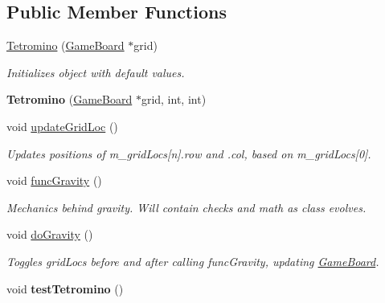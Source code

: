 \subsection*{Public Member Functions}
\begin{DoxyCompactItemize}
\item 
\hyperlink{class_tetromino_a1e693a4b99478302e7c7071667512e5f}{Tetromino} (\hyperlink{class_game_board}{Game\-Board} $\ast$grid)
\begin{DoxyCompactList}\small\item\em Initializes object with default values. \end{DoxyCompactList}\item 
\hypertarget{class_tetromino_a7be393128fb83186dbf63279f5200387}{{\bfseries Tetromino} (\hyperlink{class_game_board}{Game\-Board} $\ast$grid, int, int)}\label{class_tetromino_a7be393128fb83186dbf63279f5200387}

\item 
\hypertarget{class_tetromino_abe7074d0ac3811a17e567f1f810dcfef}{void \hyperlink{class_tetromino_abe7074d0ac3811a17e567f1f810dcfef}{update\-Grid\-Loc} ()}\label{class_tetromino_abe7074d0ac3811a17e567f1f810dcfef}

\begin{DoxyCompactList}\small\item\em Updates positions of m\-\_\-grid\-Locs\mbox{[}n\mbox{]}.row and .col, based on m\-\_\-grid\-Locs\mbox{[}0\mbox{]}. \end{DoxyCompactList}\item 
\hypertarget{class_tetromino_afca549c6385f4382e28597524672f30f}{void \hyperlink{class_tetromino_afca549c6385f4382e28597524672f30f}{func\-Gravity} ()}\label{class_tetromino_afca549c6385f4382e28597524672f30f}

\begin{DoxyCompactList}\small\item\em Mechanics behind gravity. Will contain checks and math as class evolves. \end{DoxyCompactList}\item 
\hypertarget{class_tetromino_a209a18d5248708f8504c2c19cd3b96d8}{void \hyperlink{class_tetromino_a209a18d5248708f8504c2c19cd3b96d8}{do\-Gravity} ()}\label{class_tetromino_a209a18d5248708f8504c2c19cd3b96d8}

\begin{DoxyCompactList}\small\item\em Toggles grid\-Locs before and after calling func\-Gravity, updating \hyperlink{class_game_board}{Game\-Board}. \end{DoxyCompactList}\item 
\hypertarget{class_tetromino_a7fad9884d40f29795f208546842d3188}{void {\bfseries test\-Tetromino} ()}\label{class_tetromino_a7fad9884d40f29795f208546842d3188}


\end{DoxyCompactItemize}
